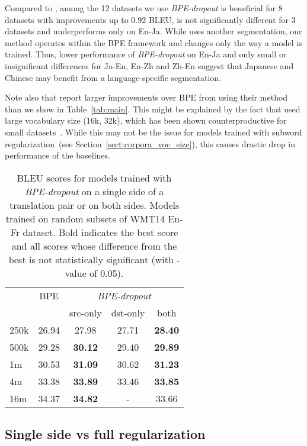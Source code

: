 \documentclass[11pt,a4paper]{article}
\begin{document}
Compared to \citet{sentencepiece}, among the 12 datasets we use \textit{BPE-dropout} is beneficial for 8 datasets with improvements up to  0{.}92 BLEU, is not significantly different for 3 datasets and underperforms only on En-Ja. While \citet{sentencepiece} uses another segmentation, our method operates within the BPE framework and changes only the way a model is trained. Thus, lower performance of \textit{BPE-dropout} on En-Ja and only small or insignificant differences for Ja-En, En-Zh and Zh-En suggest that Japanese and Chinese may benefit from a language-specific segmentation.

Note also that \citet{sentencepiece} report larger improvements over BPE from using their method than we show in Table~\ref{tab:main}. This might be explained by the fact that \citet{sentencepiece} used large vocabulary size (16k, 32k), which has been shown counterproductive for small datasets~\cite{sennrich-zhang-2019-revisiting,lowresBPE}. While this may not be the issue for models trained with subword regularization~(see Section~\ref{sect:corpora_voc_size}), this causes drastic drop in performance of the baselines.




\begin{table}[t!]
\centering
\begin{tabular}{lcccc}
\toprule
 & BPE & \multicolumn{3}{c}{\textit{BPE-dropout}}\\
 & & src-only  & dst-only & both\\

\midrule
250k & 26{.}94 & 27{.}98 & 27{.}71 & \bf{28{.}40} \\
500k & 29{.}28 & \bf{30{.}12} & 29{.}40 & \bf{29{.}89} \\
1m & 30{.}53 & \bf{31{.}09} & 30{.}62 & \bf{31{.}23} \\
4m & 33{.}38 & \bf{33{.}89} & 33{.}46 & \bf{33{.}85} \\
16m & 34{.}37 & \bf{34{.}82} & - & 33{.}66 \\
\bottomrule
\end{tabular}
\caption{BLEU scores for models trained with \textit{BPE-dropout} on a single side of a translation pair or on both sides. Models trained on random subsets of WMT14 En-Fr dataset. Bold indicates the best score and all scores whose difference from the best is not statistically significant (with -value of 0.05).}
\label{tab:one_side}
\end{table}


\subsection{Single side vs full regularization}
\label{sect:drop_on_one_side}
\end{document}
